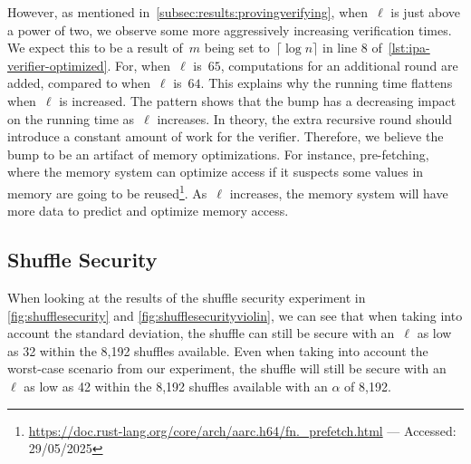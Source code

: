 However, as mentioned in~\autoref{subsec:results:provingverifying}, when~$\ell$ is just above a power of two, we observe some more aggressively increasing verification times.
We expect this to be a result of~$m$ being set to~$\lceil\log n\rceil$ in line 8 of~\autoref{lst:ipa-verifier-optimized}.
For, when~$\ell$ is~$65$, computations for an additional round are added, compared to when~$\ell$ is~$64$.
This explains why the running time flattens when~$\ell$ is increased.
The pattern shows that the bump has a decreasing impact on the running time as~$\ell$ increases.
In theory, the extra recursive round should introduce a constant amount of work for the verifier.
Therefore, we believe the bump to be an artifact of memory optimizations.
For instance, pre-fetching, where the memory system can optimize access if it suspects some values in memory are going to be reused\footnote{\href{https://doc.rust-lang.org/core/arch/aarch64/fn._prefetch.html}{https://doc.rust-lang.org/core/arch/aarc.h64/fn.\_prefetch.html} — Accessed: 29/05/2025}.
As~$\ell$ increases, the memory system will have more data to predict and optimize memory access.

\subsection{Shuffle Security}\label{subsec:Discution-Shuffle-security}
When looking at the results of the shuffle security experiment in \autoref{fig:shufflesecurity} and \autoref{fig:shufflesecurityviolin}, we can see that when taking into account the standard deviation, the shuffle can still be secure with an~$\ell$ as low as 32 within the 8,192 shuffles available.
Even when taking into account the worst-case scenario from our experiment, the shuffle will still be secure with an~$\ell$ as low as 42 within the 8,192 shuffles available with an $\alpha$ of 8,192.

